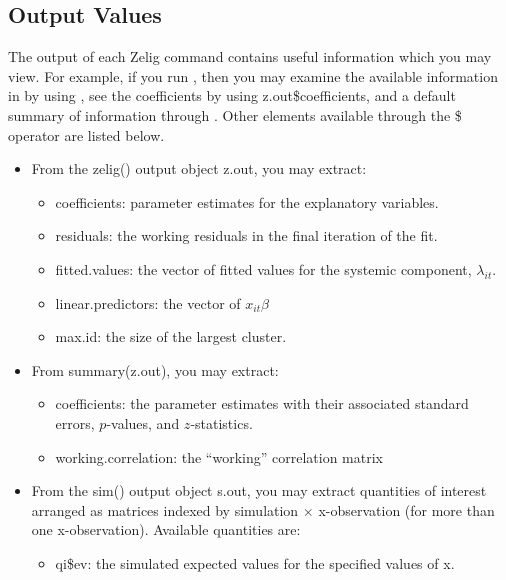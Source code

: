 \documentclass[letterpaper,10pt,english]{sphinxmanual}
\begin{document}
\subsection{Output Values}
\label{vignette:id138}
The output of each Zelig command contains useful information which you
may view. For example, if you run
, then you may
examine the available information in  by using
, see the coefficients by using z.out\$coefficients, and
a default summary of information through . Other
elements available through the \$ operator are listed below.
\begin{itemize}
\item {} 
From the zelig() output object z.out, you may extract:
\begin{itemize}
\item {} 
coefficients: parameter estimates for the explanatory variables.

\item {} 
residuals: the working residuals in the final iteration of the
fit.

\item {} 
fitted.values: the vector of fitted values for the systemic
component, \(\lambda_{it}\).

\item {} 
linear.predictors: the vector of \(x_{it}\beta\)

\item {} 
max.id: the size of the largest cluster.

\end{itemize}

\item {} 
From summary(z.out), you may extract:
\begin{itemize}
\item {} 
coefficients: the parameter estimates with their associated
standard errors, \(p\)-values, and \(z\)-statistics.

\item {} 
working.correlation: the “working” correlation matrix

\end{itemize}

\item {} 
From the sim() output object s.out, you may extract quantities of
interest arranged as matrices indexed by simulation \(\times\)
x-observation (for more than one x-observation). Available quantities
are:
\begin{itemize}
\item {} 
qi\$ev: the simulated expected values for the specified values of
x.


\end{itemize}
\end{itemize}
\end{document}
